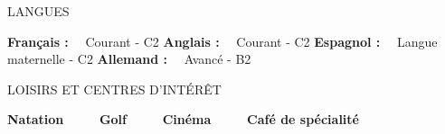 \documentclass{resume} %
\begin{document}
%
%

\begin{rSection}{LANGUES}

{\bf Français :} \ \ {Courant - C2} \hfill {\bf Anglais :} \ \ {Courant - C2} \hfill {\bf Espagnol :} \ \ {Langue maternelle - C2} \hfill {\bf Allemand :} \ \ {Avancé - B2}

\end{rSection}

%
%

\begin{rSection}{LOISIRS ET CENTRES D’INTÉRÊT}

    {\bf Natation} \ \ \ \ \ {\bf Golf} \ \ \ \ \ {\bf Cinéma} \ \ \ \ \ {\bf Café de spécialité}
    
\end{rSection}
\end{document}
